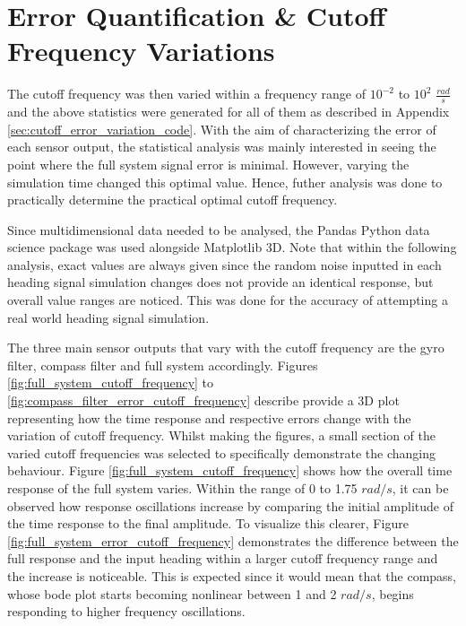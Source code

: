 \section{Error Quantification \&  Cutoff Frequency Variations}

The cutoff frequency was then varied within a frequency range of $10^{-2}$ to $10^2$ $\frac{rad}{s}$ and the above statistics were generated for all of them as described in Appendix \ref{sec:cutoff_error_variation_code}. With the aim of characterizing the error of each sensor output, the statistical analysis was mainly interested in seeing the point where the full system signal error is minimal. However, varying the simulation time changed this optimal value. Hence, futher analysis was done to practically determine the practical optimal cutoff frequency.

Since multidimensional data needed to be analysed, the Pandas Python data science package was used alongside Matplotlib 3D. Note that within the following analysis, exact values are always given since the random noise inputted in each heading signal simulation changes does not provide an identical response, but overall value ranges are noticed. This was done for the accuracy of attempting a real world heading signal simulation.

The three main sensor outputs that vary with the cutoff frequency are the gyro filter, compass filter and full system accordingly. Figures \ref{fig:full_system_cutoff_frequency} to \ref{fig:compass_filter_error_cutoff_frequency} describe provide a 3D plot representing how the time response and respective errors change with the variation of cutoff frequency. Whilst making the figures, a small section of the varied cutoff frequencies was selected to specifically demonstrate the changing behaviour. Figure \ref{fig:full_system_cutoff_frequency} shows how the overall time response of the full system varies. Within the range of 0 to 1.75 $rad/s$, it can be observed how response oscillations increase by comparing the initial amplitude of the time response to the final amplitude. To visualize this clearer, Figure \ref{fig:full_system_error_cutoff_frequency} demonstrates the difference between the full response and the input heading within a larger cutoff frequency range and the increase is noticeable. This is expected since it would mean that the compass, whose bode plot starts becoming nonlinear between 1 and 2 $rad/s$, begins responding to higher frequency oscillations.

